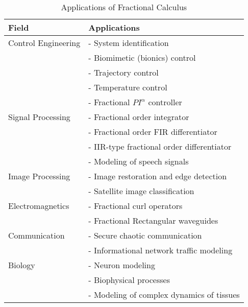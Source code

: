 \documentclass {llncs}
\begin{document}
\begin{table}
\begin{center} \label{tab:applications}
     \begin{tabular}{ | l | p{7cm} |}
     \hline
     \textbf{Field } & \textbf{Applications}  \\ \hline\hline
     Control Engineering   & - System identification \cite{sysid_99}\\
                           & - Biomimetic (bionics) control \cite{biom_04} \\
                           & - Trajectory control \cite{tr_2002}\\
                           & - Temperature control \cite{tmp_02}\\
                           & - Fractional $PI^{\alpha}$ controller \cite{pi_07}  \\ \hline
     Signal Processing  &  - Fractional order integrator   \cite{dspdiffint_08} \\
                        &  - Fractional order FIR differentiator \cite{fracFIR_01}\\
                        &  - IIR-type fractional order differentiator \cite{fracIIR_03} \\
                        &  - Modeling of speech signals \cite{speech_07}\\\hline
     Image Processing   & - Image restoration and edge detection \cite{image_03} \\
                        & - Satellite image classification \cite{sattliteimage_03} \\ \hline
     Electromagnetics   & - Fractional curl operators \cite{Engheta_98,Naqvi_04}\\
                        & - Fractional Rectangular waveguides \cite{faryad_07}\\ \hline
     Communication   & - Secure chaotic communication \cite{chaotic_09} \\
                     & - Informational network traffic modeling \cite{informational_01}\\ \hline
     Biology   & - Neuron modeling \cite{neuro_94}\\
               & - Biophysical processes \cite{biophy_09} \\
               & - Modeling of complex dynamics of tissues \cite{tissue_10} \\
               \hline\hline

 \end{tabular}
  \end{center}
  \caption{Applications of Fractional Calculus}
\end{table}
\end{document}
